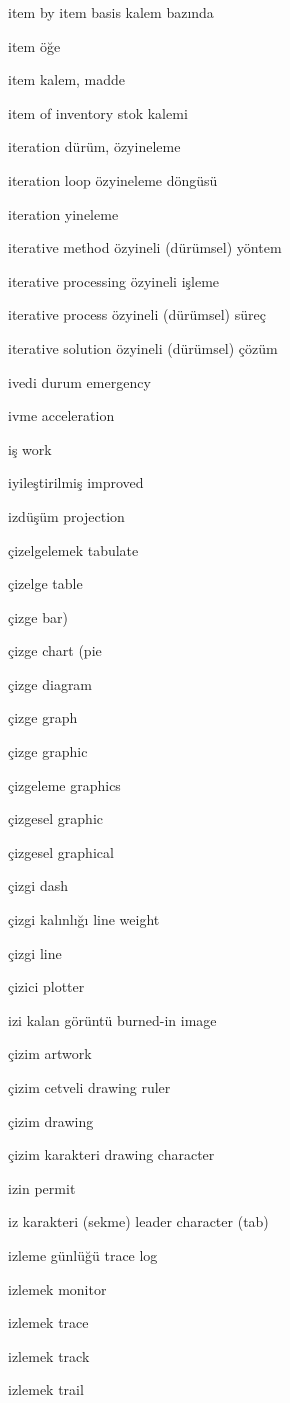 \documentclass[12pt,fleqn]{article}\usepackage{../../common}
\begin{document}
item by item basis kalem bazında

item öğe

item kalem, madde

item of inventory stok kalemi

iteration dürüm, özyineleme

iteration loop özyineleme döngüsü

iteration yineleme

iterative method özyineli (dürümsel) yöntem

iterative processing özyineli işleme

iterative process özyineli (dürümsel) süreç

iterative solution özyineli (dürümsel) çözüm

ivedi durum emergency

ivme acceleration

iş work

iyileştirilmiş improved

izdüşüm projection

çizelgelemek tabulate

çizelge table

çizge bar)

çizge chart (pie

çizge diagram

çizge graph

çizge graphic

çizgeleme graphics

çizgesel graphic

çizgesel graphical

çizgi dash

çizgi kalınlığı line weight

çizgi line

çizici plotter

izi kalan görüntü burned-in image

çizim artwork

çizim cetveli drawing ruler

çizim drawing

çizim karakteri drawing character

izin permit

iz karakteri (sekme) leader character (tab)

izleme günlüğü trace log

izlemek monitor

izlemek trace

izlemek track

izlemek trail
\end{document}
